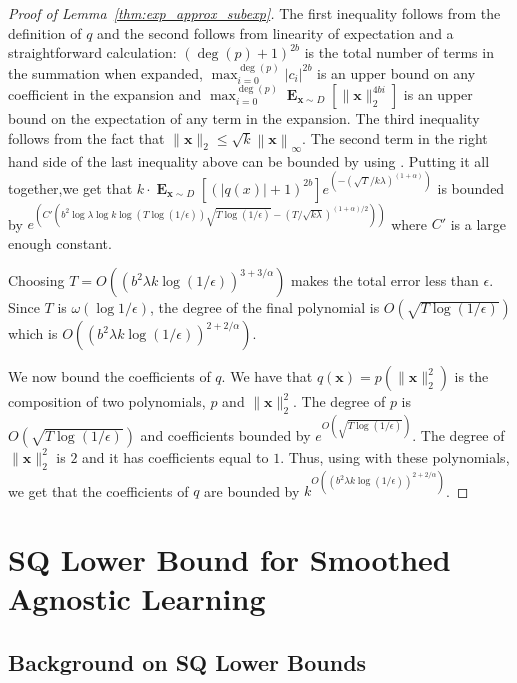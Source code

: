 \documentclass{theoretics}
\newcommand\twonorm[1]{\|#1\|_2}
\newcommand\norm[1]{\left\| #1 \right\|}
\renewcommand\vec[1]{\mathbf{#1}}
\DeclareMathOperator*{\E}{\mathbf{E}}
\newcommand{\1}{\Ind}
\newcommand{\x}{\vec x}
\begin{document}
\begin{proof}[Proof of Lemma~\ref{thm:exp_approx_subexp}]
     The first inequality follows from the definition of $q$ and the second follows from linearity of expectation and a straightforward calculation: $(\deg(p)+1)^{2b}$ is the total number of terms in the summation when expanded, $\max_{i=0}^{\deg(p)}|c_i|^{2b}$ is an upper bound on any coefficient in the expansion and $\max_{i=0}^{\deg(p)}\E_{\x\sim D}[\twonorm{\x}^{4bi}]$ is an upper bound on the expectation of any term in the expansion. The third inequality follows from the fact that $\twonorm{\x}\leq \sqrt{k}\norm{\x}_{\infty}$. The second term in the right hand side of the last inequality above can be bounded by using . Putting it all together,we get that  $k\cdot\E_{\x\sim D}\left[(|q(x)|+1)^{2b}\right] e^{\left(-(\sqrt{T}/k\lambda)^{(1+\alpha)}\right)}$ is bounded by 
     $e^{\left(C'\left(b^2 \log \lambda\log k \log\left(T\log(1/\epsilon)\right)\sqrt{T\log(1/\epsilon)}-(T/\sqrt{k\lambda})^{(1+\alpha)/2}\right)\right)}$ where $C'$ is a large enough constant.     

     Choosing $T=O\left(\left(b^2\lambda k\log(1/\epsilon)\right)^{3+3/\alpha}\right)$ makes the total error less than $\epsilon$. Since $T$ is $\omega(\log 1/\epsilon)$, the degree of the final polynomial is $O(\sqrt{T\log(1/\epsilon)})$ which is $O\left( (b^2\lambda k\log(1/\epsilon))^{2+2/\alpha} \right)$.

     We now bound the coefficients of $q$. We have that $q(\x)=p(\twonorm{\x}^2)$ is the composition of two polynomials, $p$ and $\twonorm{\x}^2$. The degree of $p$ is $O(\sqrt{T\log (1/\epsilon)})$ and coefficients bounded by $e^{O\left(\sqrt{T\log(1/\epsilon)}\right)}$. The degree of $\twonorm{\x}^2$ is $2$ and it has coefficients equal to $1$. Thus, using  with these polynomials, we get that the coefficients of $q$ are bounded by $k^{O\left( (b^{2}\lambda k\log(1/\epsilon))^{2+2/\alpha} \right)}$.
\end{proof}
    
\section{SQ Lower Bound for Smoothed Agnostic Learning}





\subsection{Background on SQ Lower Bounds}
\label{ssec:SQ-prelims}
\end{document}
